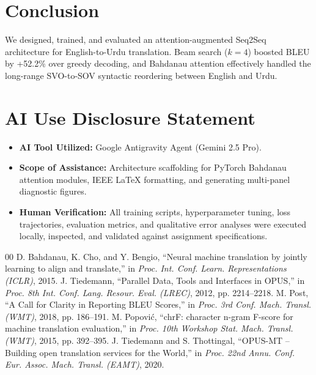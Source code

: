 \documentclass[conference]{IEEEtran}
\begin{document}
\section{Conclusion}
We designed, trained, and evaluated an attention-augmented Seq2Seq architecture for English-to-Urdu translation. Beam search ($k=4$) boosted BLEU by +52.2\% over greedy decoding, and Bahdanau attention effectively handled the long-range SVO-to-SOV syntactic reordering between English and Urdu.

\newpage
\section*{AI Use Disclosure Statement}
\begin{itemize}
\item \textbf{AI Tool Utilized:} Google Antigravity Agent (Gemini 2.5 Pro).
\item \textbf{Scope of Assistance:} Architecture scaffolding for PyTorch Bahdanau attention modules, IEEE LaTeX formatting, and generating multi-panel diagnostic figures.
\item \textbf{Human Verification:} All training scripts, hyperparameter tuning, loss trajectories, evaluation metrics, and qualitative error analyses were executed locally, inspected, and validated against assignment specifications.
\end{itemize}

\begin{thebibliography}{00}
 D. Bahdanau, K. Cho, and Y. Bengio, ``Neural machine translation by jointly learning to align and translate,'' in \textit{Proc. Int. Conf. Learn. Representations (ICLR)}, 2015.
 J. Tiedemann, ``Parallel Data, Tools and Interfaces in OPUS,'' in \textit{Proc. 8th Int. Conf. Lang. Resour. Eval. (LREC)}, 2012, pp. 2214--2218.
 M. Post, ``A Call for Clarity in Reporting BLEU Scores,'' in \textit{Proc. 3rd Conf. Mach. Transl. (WMT)}, 2018, pp. 186--191.
 M. Popovi{\'c}, ``chrF: character n-gram F-score for machine translation evaluation,'' in \textit{Proc. 10th Workshop Stat. Mach. Transl. (WMT)}, 2015, pp. 392--395.
 J. Tiedemann and S. Thottingal, ``OPUS-MT -- Building open translation services for the World,'' in \textit{Proc. 22nd Annu. Conf. Eur. Assoc. Mach. Transl. (EAMT)}, 2020.
\end{thebibliography}
\end{document}
